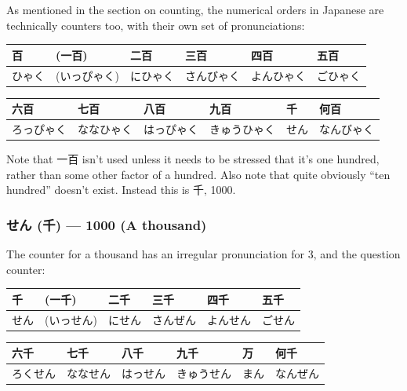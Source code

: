 \documentclass[11pt, b5paper, twoside, openright, onecolumn]{book}
\makeatletter
\newcommand*{\rubystack}[2]{{\relscale{0.5}%
  \begin{tabular}[b]{@{}c@{}}%
    {#1}\\%
   {\textscale{2}{#2}}%
  \end{tabular}}%
}
\DeclareRobustCommand*{\ruby}[2]{%
  \mbox{%
    \setlength{\parskip}{0ex}%
    \BeginAccSupp{method=pdfstringdef,ActualText={#1}}%
      \rubystack{\phantom{#2}}{#1}%
      \llap{%
        \rubystack{#2}{\phantom{#1}}%
      }%
    \EndAccSupp{}%
  }%
}
\renewcommand*{\ruby}[2]{#2 (#1)}%
\newenvironment{mytabular}[1]{\noindent\hspace{0.4in}
\begin{tabular}[h]{#1}}{\end{tabular}}
\makeatother
\begin{document}
As mentioned in the section on counting‚ the numerical orders in Japanese are technically counters too‚ with their own set of pronunciations:

\vspace{0.5cm}
\smaller
\begin{mytabular}{| l  l  l  l  l  l |}\hline 
\rule{0pt}{2.4ex}百 & (一百) & 二百 & 三百 & 四百 & 五百\\ 
\hline
\rule{0pt}{2.4ex}ひゃく & (いっぴゃく) & にひゃく & さんびゃく & よんひゃく & ごひゃく\\ 
\hline 
\end{mytabular}
\larger
\vspace{0.5cm}

\smaller
\begin{mytabular}{| l  l  l  l  l  l |}\hline 
\rule{0pt}{2.4ex}六百 & 七百 & 八百 & 九百 & 千 & 何百\\ 
\hline
\rule{0pt}{2.4ex}ろっぴゃく & ななひゃく & はっぴゃく & きゅうひゃく & せん & なんびゃく\\ 
\hline 
\end{mytabular}
\larger
\vspace{0.5cm}


Note that 一百 isn’t used unless it needs to be stressed that it’s one hundred‚ rather than some other factor of a hundred. Also note that quite obviously “ten hundred” doesn’t exist. Instead this is 千‚ 1000.

\subsubsection{\ruby{千}{せん} — 1000 (A thousand)}

The counter for a thousand has an irregular pronunciation for 3‚ and the question counter:

\vspace{0.5cm}
\smaller
\begin{mytabular}{| l  l  l  l  l  l |}\hline 
\rule{0pt}{2.4ex}千 & (一千) & 二千 & 三千 & 四千 & 五千\\ 
\hline
\rule{0pt}{2.4ex}せん & (いっせん) & にせん & さんぜん & よんせん & ごせん\\ 
\hline 
\end{mytabular}
\larger
\vspace{0.5cm}

\smaller
\begin{mytabular}{| l  l  l  l  l  l |}\hline 
\rule{0pt}{2.4ex}六千 & 七千 & 八千 & 九千 & 万 & 何千\\ 
\hline
\rule{0pt}{2.4ex}ろくせん & ななせん & はっせん & きゅうせん & まん & なんぜん\\ 
\hline 
\end{mytabular}
\larger
\vspace{0.5cm}
\end{document}
